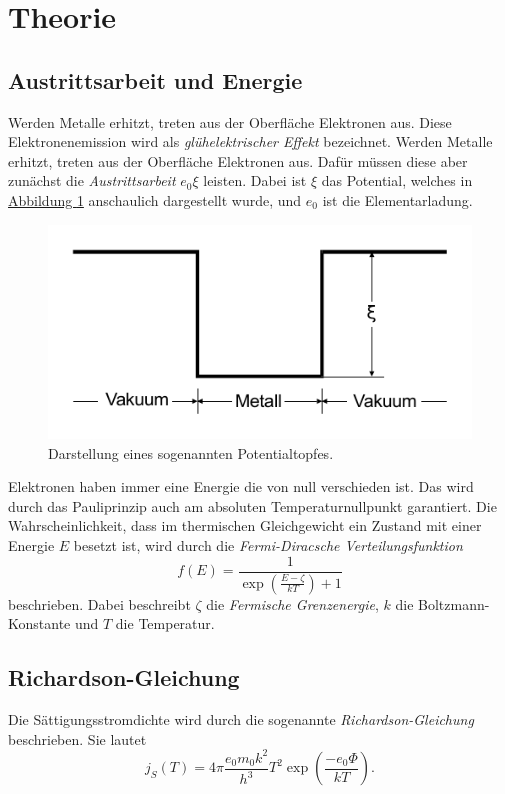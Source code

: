 \section{Theorie}
\label{sec:Theorie}

\subsection{Austrittsarbeit und Energie}

\label{sec:Austrittsarbeit und Energie}
Werden Metalle erhitzt, treten aus der Oberfläche Elektronen aus.
Diese Elektronenemission wird als \textit{glühelektrischer Effekt} bezeichnet.
Werden Metalle erhitzt, treten aus der Oberfläche Elektronen aus.
Dafür müssen diese aber zunächst die \textit{Austrittsarbeit} $e_0 \xi$ leisten.
Dabei ist $\xi$ das Potential, welches in \hyperref[fig:Potentialtopf]{Abbildung \ref{fig:Potentialtopf}} anschaulich dargestellt wurde, und
$e_0$ ist die Elementarladung.
\begin{figure}[h]
    \centering
    \includegraphics[width=0.6\linewidth]{pictures/Potentialtopf.pdf}
    \caption{Darstellung eines sogenannten Potentialtopfes. \cite{v504}}
    \label{fig:Potentialtopf}
\end{figure} 
Elektronen haben immer eine Energie die von null verschieden ist.
Das wird durch das Pauliprinzip auch am absoluten Temperaturnullpunkt garantiert.
Die Wahrscheinlichkeit, dass im thermischen Gleichgewicht ein Zustand mit einer Energie $E$ besetzt ist, wird durch die
\textit{Fermi-Diracsche Verteilungsfunktion}
\begin{equation}
    f(E)=\frac{1}{\exp \left(\frac{E-\zeta}{k T}\right)+1}
\end{equation}
beschrieben. Dabei beschreibt $\zeta$ die \textit{Fermische Grenzenergie}, $k$ die Boltzmann-Konstante und $T$ die Temperatur.


\subsection{Richardson-Gleichung}

\label{eq:Richardson}
Die Sättigungsstromdichte wird durch die sogenannte \textit{Richardson-Gleichung} \cite{v504} beschrieben. Sie lautet
\begin{equation}
    j_{S}(T)=4 \pi \frac{e_{0} m_{0} k^{2}}{h^{3}} T^{2} \exp \left(\frac{-e_{0} \Phi}{k T}\right) .
\end{equation}


